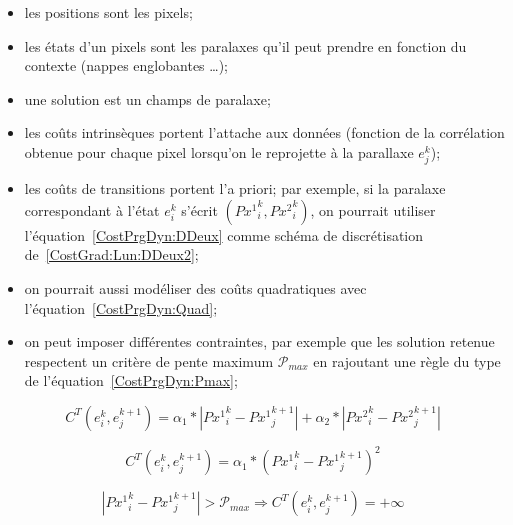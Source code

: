 \begin{itemize}
    \item les positions sont les pixels;

    \item les \'etats d'un pixels sont les paralaxes qu'il peut prendre
          en fonction du contexte (nappes englobantes \dots);

    \item une solution est un champs de paralaxe;

    \item les co\^uts intrins\`eques portent  l'attache
          aux donn\'ees (fonction de la corr\'elation obtenue pour chaque pixel
          lorsqu'on le reprojette \`a la parallaxe $e^k_j$);

    \item les co\^uts  de transitions  portent  l'a priori;
          par exemple, si la paralaxe correspondant \`a
          l'\'etat $e^k_i$  s'\'ecrit $({Px^1}^k_i,{Px^2}^k_i)$, on pourrait
          utiliser l'\'equation~\ref{CostPrgDyn:DDeux} comme sch\'ema de
          discr\'etisation de~\ref{CostGrad:Lun:DDeux2};

    \item on pourrait  aussi  mod\'eliser des co\^uts quadratiques avec
          l'\'equation~\ref{CostPrgDyn:Quad};

    \item on peut imposer diff\'erentes contraintes, par exemple
           que les solution retenue respectent un crit\`ere
          de pente maximum $ \mathcal P_{max}$  en rajoutant une r\`egle du type
          de l'\'equation~\ref{CostPrgDyn:Pmax};


\end{itemize}


\begin{equation}
\label{CostPrgDyn:DDeux}
C^T(e^k_i,e^{k+1}_j) =    \alpha_1* |{Px^1}^k_i-{Px^1}^{k+1}_j|
                          + \alpha_2* |{Px^2}^k_i-{Px^2}^{k+1}_j|
\end{equation}

\begin{equation}
\label{CostPrgDyn:Quad}
C^T(e^k_i,e^{k+1}_j) =    \alpha_1* ({Px^1}^k_i-{Px^1}^{k+1}_j)^2
\end{equation}

\begin{equation}
\label{CostPrgDyn:Pmax}
   |{Px^1}^k_i-{Px^1}^{k+1}_j| > \mathcal P_{max} \Rightarrow  C^T(e^k_i,e^{k+1}_j) = + \infty
\end{equation}


